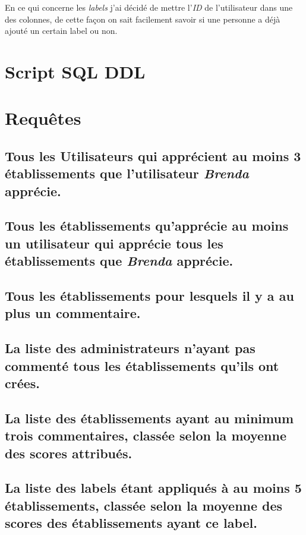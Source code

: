 \documentclass[a4paper,10pt]{article}
\begin{document}
En ce qui concerne les \emph{labels} j'ai décidé de mettre l'\emph{ID} de
l'utilisateur dans une des colonnes, de cette façon on sait facilement savoir
si une personne a déjà ajouté un certain label ou non.

\section{Script SQL DDL}
    

    \pagebreak

\section{Requêtes}
\subsection{Tous les Utilisateurs qui apprécient au moins 3 établissements que
l'utilisateur \emph{Brenda} apprécie.}
    

\subsection{Tous les établissements qu'apprécie au moins un utilisateur qui
apprécie tous les établissements que \emph{Brenda} apprécie.}
    

\subsection{Tous les établissements pour lesquels il y a au plus un
commentaire.}
    

\subsection{La liste des administrateurs n'ayant pas commenté tous les
établissements qu'ils ont crées.}
    

\subsection{La liste des établissements ayant au minimum trois commentaires,
classée selon la moyenne des scores attribués.}
    

\subsection{La liste des labels étant appliqués à au moins 5 établissements,
classée selon la moyenne des scores des établissements ayant ce label.}
    
\end{document}

